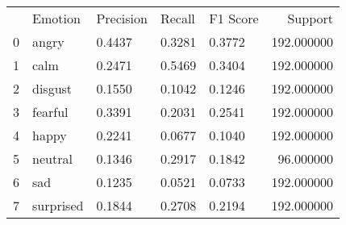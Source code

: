 \begin{tabular}{lllllr}
 & Emotion & Precision & Recall & F1 Score & Support \\
0 & angry & 0.4437 & 0.3281 & 0.3772 & 192.000000 \\
1 & calm & 0.2471 & 0.5469 & 0.3404 & 192.000000 \\
2 & disgust & 0.1550 & 0.1042 & 0.1246 & 192.000000 \\
3 & fearful & 0.3391 & 0.2031 & 0.2541 & 192.000000 \\
4 & happy & 0.2241 & 0.0677 & 0.1040 & 192.000000 \\
5 & neutral & 0.1346 & 0.2917 & 0.1842 & 96.000000 \\
6 & sad & 0.1235 & 0.0521 & 0.0733 & 192.000000 \\
7 & surprised & 0.1844 & 0.2708 & 0.2194 & 192.000000 \\
\end{tabular}
